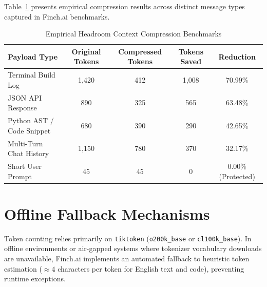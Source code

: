 Table~\ref{tab:compression_performance} presents empirical compression results across distinct message types captured in Finch.ai benchmarks.

\begin{table}[htbp]
\centering
\small
\begin{tabular}{lcccc}
\toprule
\textbf{Payload Type} & \textbf{Original Tokens} & \textbf{Compressed Tokens} & \textbf{Tokens Saved} & \textbf{Reduction} \\
\midrule
Terminal Build Log & 1,420 & 412 & 1,008 & 70.99\% \\
JSON API Response & 890 & 325 & 565 & 63.48\% \\
Python AST / Code Snippet & 680 & 390 & 290 & 42.65\% \\
Multi-Turn Chat History & 1,150 & 780 & 370 & 32.17\% \\
Short User Prompt & 45 & 45 & 0 & 0.00\% (Protected) \\
\bottomrule
\end{tabular}
\caption{Empirical Headroom Context Compression Benchmarks}
\label{tab:compression_performance}
\end{table}

\section{Offline Fallback Mechanisms}
Token counting relies primarily on \texttt{tiktoken} (\texttt{o200k\_base} or \texttt{cl100k\_base}). In offline environments or air-gapped systems where tokenizer vocabulary downloads are unavailable, Finch.ai implements an automated fallback to heuristic token estimation ($\approx 4$ characters per token for English text and code), preventing runtime exceptions.
